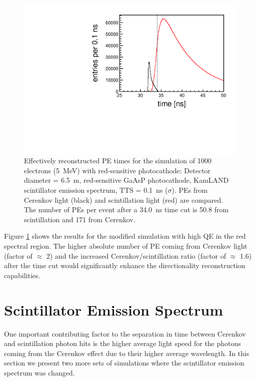 \documentclass[aps,prc,twocolumn,groupedaddress,showpacs,amsmath,amssymb,floatfix,superscriptaddress]{revtex4}
\begin{document}
\begin{figure}
        \begin{center}
        \includegraphics[scale=0.40]{graphs/6p5Meter_5MeVElectrons_RedSensitiveQE_KamlandScintSpec_TIME.pdf}
        \caption[]{Effectively reconstructed PE times for the simulation of 1000 electrons (5~MeV) with red-sensitive photocathode: Detector diameter = 6.5~m, red-sensitive GaAsP photocathode, KamLAND scintillator emission spectrum, TTS = 0.1~ns ($\sigma$). PEs from Cerenkov light (black) and scintillation light (red) are compared. The number of PEs per event after a 34.0~ns time cut is 50.8 from scintillation and 171 from Cerenkov. \label{6p5Meter_5MeVElectrons_RedSensitiveQE_KamlandScintSpec_TIME}}
        \end{center}
\end{figure}

Figure \ref{6p5Meter_5MeVElectrons_RedSensitiveQE_KamlandScintSpec_TIME} shows the results for the modified simulation with high QE in the red spectral region. The higher absolute number of PE coming from Cerenkov light (factor of $\approx$ 2) and the increased Cerenkov/scintillation ratio (factor of $\approx$ 1.6) after the time cut would significantly enhance the directionality reconstruction capabilities.  

\section{Scintillator Emission Spectrum}
\label{scintillator_emission_sec}
One important contributing factor to the separation in time between Cerenkov and scintillation photon hits is the higher average light speed for the photons coming from the Cerenkov effect due to their higher average wavelength. In this section we present two more sets of simulations where the scintillator emission spectrum was changed. 
\end{document}
